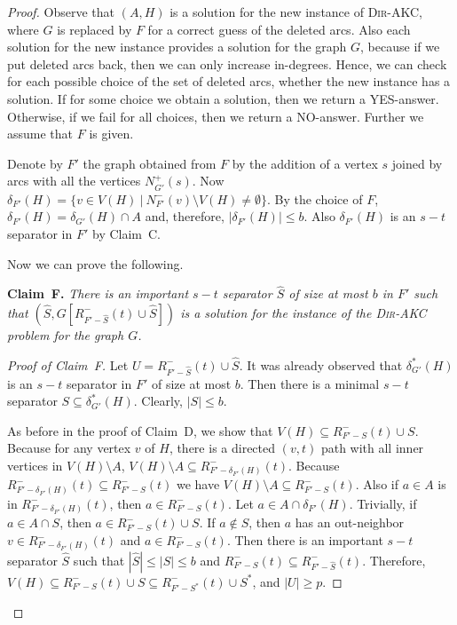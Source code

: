 \documentclass[11pt,a4paper]{article}
\newcommand{\DAKC}{\textsc{Dir-AKC}\xspace}
\begin{document}
\begin{proof}
Observe that $(A,H)$ is a solution for the new instance of \DAKC, where $G$ is replaced by $F$ for a correct guess of the
deleted arcs. Also each solution for the new instance provides a solution for the graph $G$, because if we put deleted arcs
back, then we can only increase in-degrees. Hence, we can check for each possible choice of the set of deleted arcs, whether
the new instance has a solution. If for some choice we obtain a solution, then we return a YES-answer. Otherwise, if we fail
for all choices, then we return a NO-answer. Further we assume that $F$ is given.


Denote by $F'$ the graph obtained from $F$ by the addition of a vertex $s$ joined by arcs with all the vertices $N_{G'}^+(s)$.
Now $\delta_{F'}(H)=\{v\in V(H)\ |\ N_{F'}^-(v)\setminus V(H)\neq \emptyset\}$. By the choice of $F$,
$\delta_{F'}(H)=\delta_{G'}(H)\cap A$ and, therefore, $|\delta_{F'}(H)|\leq b$. Also $\delta_{F'}(H)$ is an $s-t$ separator in
$F'$ by Claim~C.

Now we can prove the following.

\medskip
\noindent
{\bf Claim~F.} {\it
There is an important $s-t$ separator $\hat{S}$ of size at most $b$ in $F'$ such that $(\hat{S},G[R_{F'-\hat{S}}^-(t)\cup
\hat{S}])$ is a solution for the instance of the \DAKC problem for the graph $G$.
}


\begin{proof}[Proof of Claim~F]
Let $U=R_{F'-\hat{S}}^-(t)\cup \hat{S}$. It was already observed that $\delta_{G'}^*(H)$ is an $s-t$ separator in $F'$ of size
at most $b$. Then there is a minimal $s-t$ separator $S\subseteq \delta_{G'}^*(H)$. Clearly, $|S|\leq b$.

As before in the proof of Claim~D, we show that  $V(H)\subseteq R_{F'-S}^-(t)\cup S$. Because for any vertex
$v$ of $H$, there is a directed $(v,t)$ path with all inner vertices in $V(H)\setminus A$, $V(H)\setminus A\subseteq
R_{F'-\delta_{F'}(H)}^-(t)$. Because $R_{F'-\delta_{F'}(H)}^-(t)\subseteq  R_{F'-S}^-(t)$ we have $V(H)\setminus A\subseteq
R_{F'-S}^-(t)$. Also if  $a\in A$ is in  $R_{F'-\delta_{F'}(H)}^-(t)$, then $a\in R_{F'-S}^-(t)$. Let $a\in A\cap
\delta_{F'}(H)$. Trivially, if $a\in A\cap S$, then $a\in R_{F'-S}^-(t)\cup S$. If  $a\notin S$, then $a$ has an out-neighbor
$v\in R_{F'-\delta_{F'}(H)}^-(t)$ and $a\in R_{F'-S}^-(t)$. Then there is an important $s-t$ separator $\hat{S}$ such that
$|\hat{S}|\leq |S|\leq b$ and $R_{F'-S}^-(t)\subseteq R_{F'-\hat{S}}^-(t)$. Therefore, $V(H)\subseteq R_{F'-S}^-(t)\cup
S\subseteq R_{F'-S^*}^-(t)\cup S^*$, and $|U|\geq p$.


\end{proof}
\end{proof}
\end{document}
